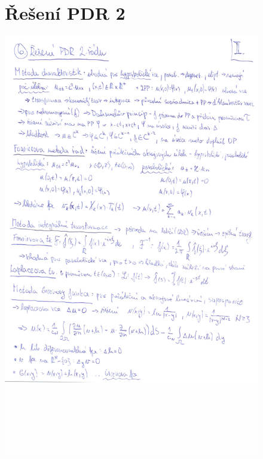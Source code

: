 \begin{figure}[H]
\section{Řešení PDR 2}
\includegraphics[width=\textwidth]{Obrazky/2-6a.jpg}
\end{figure}

